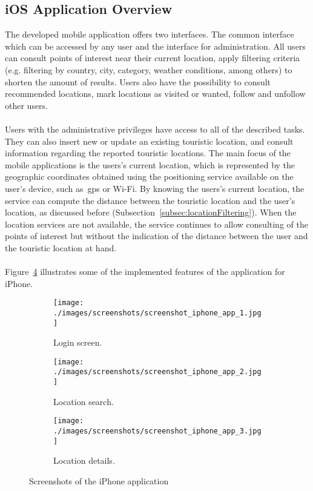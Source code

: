 \subsection{iOS Application Overview}
\label{subsec:ioHighlightedFeatures}
The developed mobile application offers two interfaces. The common interface which can be accessed by any user and the interface for administration.
All users can consult points of interest near their current location, apply filtering criteria (e.g. filtering by country, city, category, weather conditions, among others) to shorten the amount of results. Users also have the possibility to consult recommended locations, mark locations as visited or wanted, follow and unfollow other users.\\
\\
Users with the administrative privileges have access to all of the described tasks. They can also insert new or update an existing touristic location, and consult information regarding the reported touristic locations. The main focus of the mobile applications is the users's current location, which is represented by the geographic coordinates obtained using the positioning service available on the user's device, such as~\gls{gps} or Wi-Fi. By knowing the users's current location, the service can compute the distance between the touristic location and the user's location, as discussed before (Subsection~\ref{subsec:locationFiltering}). When the location services are not available, the service continues to allow consulting of the points of interest but without the indication of the distance between the user and the touristic location at hand.\\
\\
Figure~\ref{fig:guideMeWebScreenshotsIOSFull} illustrates some of the implemented features of the application for iPhone.
\begin{figure}[h!]
\begin{center}
		\centering
        \begin{subfigure}[b]{0.30\textwidth}
	     		\centering
                \texttt{[image: ./images/screenshots/screenshot\_iphone\_app\_1.jpg]}
                \caption{Login screen.}
                \label{fig:guidemeWebScreenshotsIOSFina1}
        \end{subfigure}%
        \begin{subfigure}[b]{0.30\textwidth}
 				\centering
                \texttt{[image: ./images/screenshots/screenshot\_iphone\_app\_2.jpg]}
                \caption{Location search.}
                \label{fig:guidemeWebScreenshotsIOSFina2}
        \end{subfigure}
        \begin{subfigure}[b]{0.30\textwidth}
 				\centering
                \texttt{[image: ./images/screenshots/screenshot\_iphone\_app\_3.jpg]}
                \caption{Location details.}
                \label{fig:guidemeWebScreenshotsIOSFina3}
        \end{subfigure}
        \caption{Screenshots of the iPhone application}
        \label{fig:guideMeWebScreenshotsIOSFull}
        \end{center}
\end{figure}
